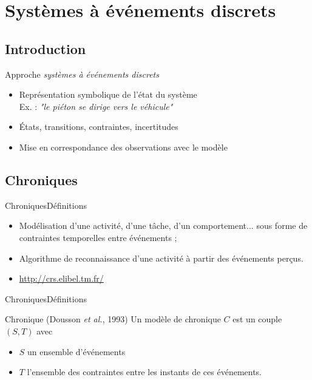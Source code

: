 \documentclass[compress]{beamer}
\begin{document}
\section{Systèmes à événements discrets}

\begin{frame}
\end{frame}

\subsection{Introduction}
\begin{frame}{Approche \it systèmes à événements discrets}
\begin{itemize}
\item Représentation symbolique de l'état du système\\
	Ex. : {\it "le piéton se dirige vers le véhicule"}\\
\item \'Etats, transitions, contraintes, incertitudes
\item Mise en correspondance des observations avec le modèle
\end{itemize}
\end{frame}

\subsection{Chroniques}
\begin{frame}{Chroniques}{Définitions}
\begin{itemize}
\item Modélisation d'une activité, d'une tâche, d'un comportement... sous forme de contraintes temporelles entre événements ;
\item Algorithme de reconnaissance d'une activité à partir des événements perçus.
\item \url{http://crs.elibel.tm.fr/}
\end{itemize}
\end{frame}

\begin{frame}{Chroniques}{Définitions}
\begin{block}{Chronique (Dousson {\it et al.}, 1993)}
Un modèle de chronique $C$ est un couple $(S, T)$ avec
\begin{itemize}
\item $S$ un ensemble d'événements
\item $T$ l'ensemble des contraintes entre les instants de ces événements.
\end{itemize}
\end{block}
\end{frame}
\end{document}
